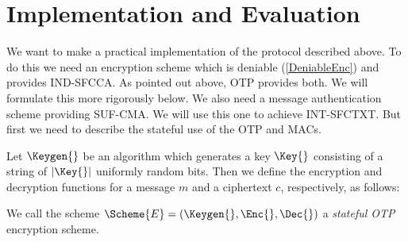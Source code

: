 \section{Implementation and Evaluation}
\label{Implementation}

We want to make a practical implementation of the protocol described above.
To do this we need an encryption scheme which is deniable (\cref{DeniableEnc}) 
and provides \ac{IND-SFCCA}.
As pointed out above, \ac{OTP} provides both.
We will formulate this more rigorously below.
We also need a message authentication scheme providing \ac{SUF-CMA}.
We will use this one to achieve \ac{INT-SFCTXT}.
But first we need to describe the stateful use of the \ac{OTP} and \acp{MAC}.

\begin{definition}\label{StatefulOTP}
  Let \(\Keygen{}\) be an algorithm which generates a key \(\Key{}\) consisting 
  of a string of \(|\Key{}|\) uniformly random bits.
  Then we define the encryption and decryption functions for a message \(m\) 
  and a ciphertext \(c\), respectively, as follows:
  \begin{center}
    \normalfont{}
    \begin{minipage}[t]{0.4\textwidth}
      \begin{algorithmic}
            \State{\Return{$\bot$}}
          \EndIf{}
        \EndFunction{}
      \end{algorithmic}
    \end{minipage}%
    \vline%
    \begin{minipage}[t]{0.4\textwidth}
      \begin{algorithmic}
            \State{\Return{$\bot$}}
          \EndIf{}
        \EndFunction{}
      \end{algorithmic}
    \end{minipage}
  \end{center}
  We call the scheme \(\Scheme{E} = (\Keygen{}, \Enc{}, \Dec{})\) 
  a \emph{stateful \ac{OTP}} encryption scheme.
\end{definition}

